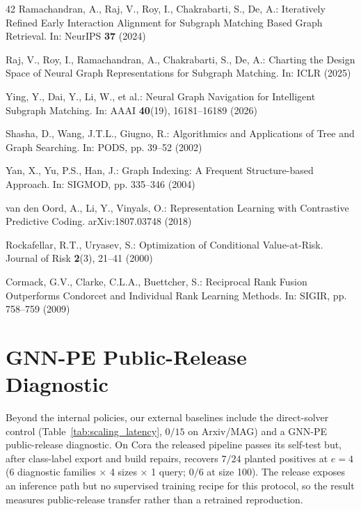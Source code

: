 \documentclass{article}
\begin{document}
{\begin{thebibliography}{42}
Ramachandran, A., Raj, V., Roy, I., Chakrabarti, S., De, A.: Iteratively Refined Early Interaction Alignment for Subgraph Matching Based Graph Retrieval. In: NeurIPS \textbf{37} (2024)

Raj, V., Roy, I., Ramachandran, A., Chakrabarti, S., De, A.: Charting the Design Space of Neural Graph Representations for Subgraph Matching. In: ICLR (2025)

Ying, Y., Dai, Y., Li, W., et al.: Neural Graph Navigation for Intelligent Subgraph Matching. In: AAAI \textbf{40}(19), 16181--16189 (2026)

Shasha, D., Wang, J.T.L., Giugno, R.: Algorithmics and Applications of Tree and Graph Searching. In: PODS, pp. 39--52 (2002)

Yan, X., Yu, P.S., Han, J.: Graph Indexing: A Frequent Structure-based Approach. In: SIGMOD, pp. 335--346 (2004)

van den Oord, A., Li, Y., Vinyals, O.: Representation Learning with Contrastive Predictive Coding. arXiv:1807.03748 (2018)

Rockafellar, R.T., Uryasev, S.: Optimization of Conditional Value-at-Risk. Journal of Risk \textbf{2}(3), 21--41 (2000)

Cormack, G.V., Clarke, C.L.A., Buettcher, S.: Reciprocal Rank Fusion Outperforms Condorcet and Individual Rank Learning Methods. In: SIGIR, pp. 758--759 (2009)

\end{thebibliography}
}

\clearpage
\appendix
\raggedbottom


\section{GNN-PE Public-Release Diagnostic}
\label{app:gnnpe}

Beyond the internal policies, our external baselines include the direct-solver control (Table~\ref{tab:scaling_latency}, $0/15$ on Arxiv/MAG) and a GNN-PE public-release diagnostic. On Cora the released pipeline passes its self-test but, after class-label export and build repairs, recovers $7/24$ planted positives at $e=4$ (6 diagnostic families $\times$ 4 sizes $\times$ 1 query; $0/6$ at size 100). The release exposes an inference path but no supervised training recipe for this protocol, so the result measures public-release transfer rather than a retrained reproduction.
\end{document}
